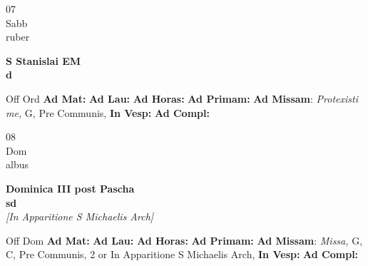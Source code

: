 \documentclass[10pt, openany]{book}
\begin{document}
        \begin{center}
            \begin{minipage}{3.5in}
                \vspace{2em}
                \begin{minipage}{0.5in}
                    {\Huge 07} \\
                    {\normalsize Sabb} \\
                    {\normalsize ruber}
                \end{minipage}
                \begin{minipage}{3.0in}
                    \textbf{ \large S Stanislai EM \\
                    \textnormal{\normalsize d}} \\ 
                \end{minipage}
                \begin{justify}Off Ord
                    \textbf{Ad Mat: }
                    \textbf{Ad Lau: }
                    \textbf{Ad Horas: }
                    \textbf{Ad Primam: }\textbf{Ad Missam}: \textit{Protexisti me,} G, Pre Communis,  
                    \textbf{In Vesp: }
                    \textbf{Ad Compl: }
                \end{justify}
            \end{minipage}
        \end{center}
    
        \begin{center}
            \begin{minipage}{3.5in}
                \vspace{2em}
                \begin{minipage}{0.5in}
                    {\Huge 08} \\
                    {\normalsize Dom} \\
                    {\normalsize albus}
                \end{minipage}
                \begin{minipage}{3.0in}
                    \textbf{ \large Dominica III post Pascha \\
                    \textnormal{\normalsize sd}} \\ \textit{[In Apparitione S Michaelis Arch]} \\ 
                \end{minipage}
                \begin{justify}Off Dom
                    \textbf{Ad Mat: }
                    \textbf{Ad Lau: }
                    \textbf{Ad Horas: }
                    \textbf{Ad Primam: }\textbf{Ad Missam}: \textit{Missa,} G, C, Pre Communis, 2 or In Apparitione S Michaelis Arch,  
                    \textbf{In Vesp: }
                    \textbf{Ad Compl: }
                \end{justify}
            \end{minipage}
        \end{center}
    
\end{document}
